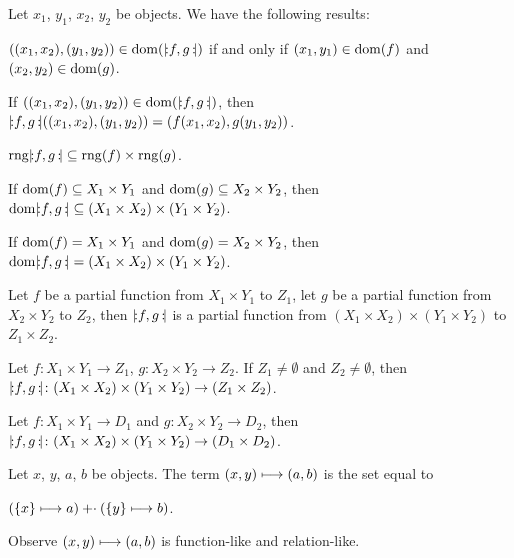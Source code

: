 \documentclass{article}
\begin{document}
Let $x_{1}$, $y_{1}$, $x_{2}$, $y_{2}$ be objects. We have the following results:
\begin{thm}
\item\label{funct4:54} $((x_{1},x_{2}),(y_{1},y_{2}))\in\operatorname{dom}(\mathopen{{|}\!{:}}f,g\,\mathclose{{:}\!{|}})$
  if and only if $(x_{1},y_{1})\in\operatorname{dom}(f)$ and $(x_{2},y_{2})\in\operatorname{dom}(g)$.
\item\label{funct4:55} If $((x_{1},x_{2}),(y_{1},y_{2}))\in\operatorname{dom}(\mathopen{{|}\!{:}}f,g\,\mathclose{{:}\!{|}})$,
  then $\mathopen{{|}\!{:}}f,g\,\mathclose{{:}\!{|}}((x_{1},x_{2}),(y_{1},y_{2}))=(f(x_{1},x_{2}),g(y_{1},y_{2}))$.
\item\label{funct4:56} $\operatorname{rng}\mathopen{{|}\!{:}}f,g\,\mathclose{{:}\!{|}}\subseteq\operatorname{rng}(f)\times\operatorname{rng}(g)$.
\item\label{funct4:57} If $\operatorname{dom}(f)\subseteq X_{1}\times Y_{1}$ and
  $\operatorname{dom}(g)\subseteq X_{2}\times Y_{2}$,
  then $\operatorname{dom}\mathopen{{|}\!{:}}f,g\,\mathclose{{:}\!{|}}\subseteq(X_{1}\times X_{2})\times(Y_{1}\times Y_{2})$.
\item\label{funct4:58} If $\operatorname{dom}(f)=X_{1}\times Y_{1}$ and
  $\operatorname{dom}(g)=X_{2}\times Y_{2}$, then $\operatorname{dom}\mathopen{{|}\!{:}}f,g\,\mathclose{{:}\!{|}}=(X_{1}\times X_{2})\times(Y_{1}\times Y_{2})$.
\item\label{funct4:59} Let $f$ be a partial function from $X_{1}\times Y_{1}$
  to $Z_{1}$, let $g$ be a partial function from $X_{2}\times Y_{2}$ to $Z_{2}$,
  then $\mathopen{{|}\!{:}}f,g\,\mathclose{{:}\!{|}}$ is a partial function from $(X_{1}\times X_{2})\times(Y_{1}\times Y_{2})$
  to $Z_{1}\times Z_{2}$.
\item\label{funct4:60} Let $f\colon X_{1}\times Y_{1}\to Z_{1}$,
  $g\colon X_{2}\times Y_{2}\to Z_{2}$. If $Z_{1}\neq\emptyset$ and $Z_{2}\neq\emptyset$,
  then $\mathopen{{|}\!{:}}f,g\,\mathclose{{:}\!{|}}\colon(X_{1}\times X_{2})\times(Y_{1}\times Y_{2})\to(Z_{1}\times Z_{2})$.
\item\label{funct4:61} Let $f\colon X_{1}\times Y_{1}\to D_{1}$ and
  $g\colon X_{2}\times Y_{2}\to D_{2}$, then
  $\mathopen{{|}\!{:}}f,g\,\mathclose{{:}\!{|}}\colon(X_{1}\times X_{2})\times(Y_{1}\times Y_{2})\to(D_{1}\times D_{2})$.
\end{thm}

\begin{definition}
Let $x$, $y$, $a$, $b$ be objects.
The term $(x,y)\longmapsto(a,b)$ is the set equal to
\begin{defn}
\item $(\{x\}\longmapsto a)\mathbin{\mathord{+}\cdot}(\{y\}\longmapsto b)$.
\end{defn}
\end{definition}

Observe $(x,y)\longmapsto(a,b)$ is function-like and relation-like.
\end{document}
